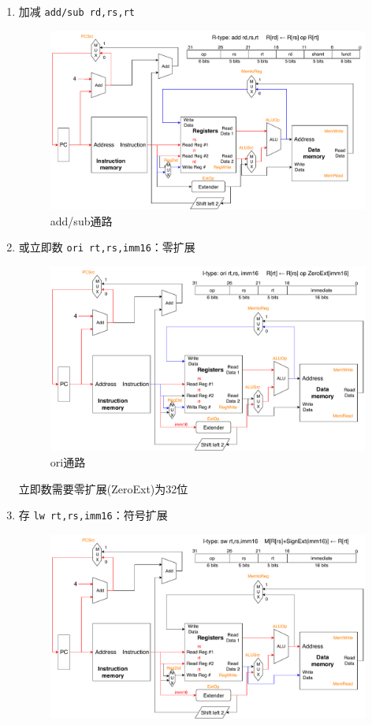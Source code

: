 \begin{enumerate}
	\item 加减 \verb'add/sub rd,rs,rt'
\begin{figure}[htbp]
\centering
\includegraphics[width=\linewidth]{fig/Datapath_add.pdf}
\caption{add/sub通路}
\end{figure}
	\item 或立即数 \verb'ori rt,rs,imm16'：零扩展
\begin{figure}[htbp]
\centering
\includegraphics[width=\linewidth]{fig/Datapath_ori.pdf}
\caption{ori通路}
\end{figure}
	立即数需要零扩展(ZeroExt)为32位
	\item 存 \verb'lw rt,rs,imm16'：符号扩展
\begin{figure}[htbp]
\centering
\includegraphics[width=\linewidth]{fig/Datapath_sw.pdf}

\end{figure}
\end{enumerate}
